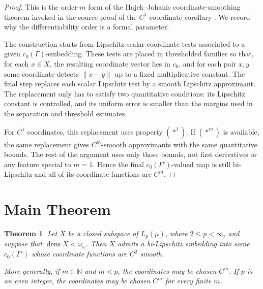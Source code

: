 \documentclass[11pt]{article}
\newtheorem{theorem}{Theorem}
\newcommand{\dens}{\operatorname{dens}}
\begin{document}
\begin{proof}
This is the order-\(m\) form of the Hajek--Johanis coordinate-smoothing
theorem invoked in the source proof of the \(C^1\)-coordinate corollary
\cite[Theorem 7.63]{HJBook}.  We record why the differentiability order is a
formal parameter.

The construction starts from Lipschitz scalar coordinate tests associated to a
given \(c_0(\Gamma)\)-embedding.  These tests are placed in thresholded
families so that, for each \(x\in X\), the resulting coordinate vector lies in
\(c_0\), and for each pair \(x,y\) some coordinate detects
\(\|x-y\|\) up to a fixed multiplicative constant.  The final step replaces
each scalar Lipschitz test by a smooth Lipschitz approximant.  The replacement
only has to satisfy two quantitative conditions: its Lipschitz constant is
controlled, and its uniform error is smaller than the margins used in the
separation and threshold estimates.

For \(C^1\) coordinates, this replacement uses property \((\ast^1)\).  If
\((\ast^m)\) is available, the same replacement gives \(C^m\)-smooth
approximants with the same quantitative bounds.  The rest of the argument
uses only those bounds, not first derivatives or any feature special to
\(m=1\).  Hence the final \(c_0(\Gamma')\)-valued map is still bi-Lipschitz
and all of its coordinate functions are \(C^m\).
\end{proof}

\section*{Main Theorem}

\begin{theorem}
\label{thm:full}
Let \(X\) be a closed subspace of \(L_p(\mu)\), where \(2\le p<\infty\), and
suppose that \(\dens X<\omega_\omega\).  Then \(X\) admits a bi-Lipschitz
embedding into some \(c_0(\Gamma')\) whose coordinate functions are
\(C^2\) smooth.

More generally, if \(m\in\mathbb N\) and \(m<p\), the coordinates may be
chosen \(C^m\).  If \(p\) is an even integer, the coordinates may be chosen
\(C^m\) for every finite \(m\).
\end{theorem}
\end{document}
